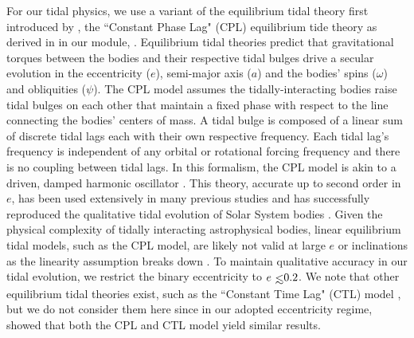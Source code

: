 For our tidal physics, we use a variant of the equilibrium tidal theory first introduced by \citet{Darwin1880}, the ``Constant Phase Lag" (CPL) equilibrium tide theory as derived in \citet{FerrazMello2008} in our module, \eqtide.  Equilibrium tidal theories predict that gravitational torques between the bodies and their respective tidal bulges drive a secular evolution in the eccentricity ($e$), semi-major axis ($a$) and the bodies' spins ($\omega$) and obliquities ($\psi$).  The CPL model assumes the tidally-interacting bodies raise tidal bulges on each other that maintain a fixed phase with respect to the line connecting the bodies' centers of mass.  A tidal bulge is composed of a linear sum of discrete tidal lags each with their own respective frequency.  Each tidal lag's frequency is independent of any orbital or rotational forcing frequency and there is no coupling between tidal lags.  In this formalism, the CPL model is akin to a driven, damped harmonic oscillator \citep{Greenberg2009}.  This theory, accurate up to second order in $e$, has been used extensively in many previous studies \citep[e.g.][]{Leconte2010,Heller2011,Barnes2013} and has successfully reproduced the qualitative tidal evolution of Solar System bodies \citep[e.g.][]{Goldreich1966}.  Given the physical complexity of tidally interacting astrophysical bodies, linear equilibrium tidal models, such as the CPL model, are likely not valid at large $e$ or inclinations as the linearity assumption breaks down \citep{FerrazMello2008,Greenberg2009}.  To maintain qualitative accuracy in our tidal evolution, we restrict the binary eccentricity to $e \lsim 0.2$.  We note that other equilibrium tidal theories exist, such as the ``Constant Time Lag" (CTL) model \citep[e.g.][]{Hut1981}, but we do not consider them here since in our adopted eccentricity regime, \citet{Leconte2010} showed that both the CPL and CTL model yield similar results.

